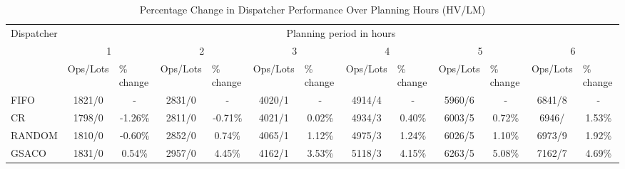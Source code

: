 \begin{table}[]
	\caption{Percentage Change in Dispatcher Performance Over Planning Hours (HV/LM)}\label{tab:dispatchers-HVLM} 
	\begin{tabular}{|l|cccccccccccc|}
		\hline
		\multirow{3}{*}{Dispatcher} &
		\multicolumn{12}{c|}{Planning period in hours} \\ \cline{2-13} 
		&
		\multicolumn{2}{c|}{1} &
		\multicolumn{2}{c|}{2} &
		\multicolumn{2}{c|}{3} &
		\multicolumn{2}{c|}{4} &
		\multicolumn{2}{c|}{5} &
		\multicolumn{2}{c|}{6} \\ \cline{2-13} 
		&
		\multicolumn{1}{l|}{Ops/Lots} &
		\multicolumn{1}{l|}{\% change} &
		\multicolumn{1}{l|}{Ops/Lots} &
		\multicolumn{1}{l|}{\% change} &
		\multicolumn{1}{l|}{Ops/Lots} &
		\multicolumn{1}{l|}{\% change} &
		\multicolumn{1}{l|}{Ops/Lots} &
		\multicolumn{1}{l|}{\% change} &
		\multicolumn{1}{l|}{Ops/Lots} &
		\multicolumn{1}{l|}{\% change} &
		\multicolumn{1}{l|}{Ops/Lots} &
		\multicolumn{1}{l|}{\% change} \\ \hline 
		FIFO &
		\multicolumn{1}{c|}{1821/0} &
		\multicolumn{1}{c|}{-} &
		\multicolumn{1}{c|}{2831/0} &
		\multicolumn{1}{c|}{-} &
		\multicolumn{1}{c|}{4020/1} &
		\multicolumn{1}{c|}{-} &
		\multicolumn{1}{c|}{4914/4} &
		\multicolumn{1}{c|}{-} &
		\multicolumn{1}{c|}{5960/6} &
		\multicolumn{1}{c|}{-} &
		\multicolumn{1}{c|}{6841/8} &
		- \\
		CR &
		\multicolumn{1}{c|}{1798/0} &
		\multicolumn{1}{c|}{-1.26\%} &
		\multicolumn{1}{c|}{2811/0} &
		\multicolumn{1}{c|}{-0.71\%} &
		\multicolumn{1}{c|}{4021/1} &
		\multicolumn{1}{c|}{0.02\%} &
		\multicolumn{1}{c|}{4934/3} &
		\multicolumn{1}{c|}{0.40\%} &
		\multicolumn{1}{c|}{6003/5} &
		\multicolumn{1}{c|}{0.72\%} &
		\multicolumn{1}{c|}{6946/}8 &
		1.53\% \\
		RANDOM &
		\multicolumn{1}{c|}{1810/0} &
		\multicolumn{1}{c|}{-0.60\%} &
		\multicolumn{1}{c|}{2852/0} &
		\multicolumn{1}{c|}{0.74\%} &
		\multicolumn{1}{c|}{4065/1} &
		\multicolumn{1}{c|}{1.12\%} &
		\multicolumn{1}{c|}{4975/3} &
		\multicolumn{1}{c|}{1.24\%} &
		\multicolumn{1}{c|}{6026/5} &
		\multicolumn{1}{c|}{1.10\%} &
		\multicolumn{1}{c|}{6973/9} &
		1.92\% \\
		GSACO &
		\multicolumn{1}{c|}{1831/0} &
		\multicolumn{1}{c|}{0.54\%} &
		\multicolumn{1}{c|}{2957/0} &
		\multicolumn{1}{c|}{4.45\%} &
		\multicolumn{1}{c|}{4162/1} &
		\multicolumn{1}{c|}{3.53\%} &
		\multicolumn{1}{c|}{5118/3} &
		\multicolumn{1}{c|}{4.15\%} &
		\multicolumn{1}{c|}{6263/5} &
		\multicolumn{1}{c|}{5.08\%} &
		\multicolumn{1}{c|}{7162/7} &
		4.69\% \\ \hline
	\end{tabular}%
\end{table}


